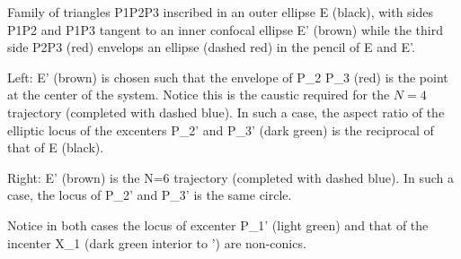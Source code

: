 Family of triangles P1P2P3 inscribed in an outer ellipse E (black), with sides P1P2 and P1P3 tangent to an inner confocal ellipse E' (brown) while the third side P2P3 (red) envelops an ellipse (dashed red) in the pencil of E and E'.

Left: E' (brown) is chosen such that the envelope of P_2 P_3 (red) is the point at the center of the system. Notice this is the caustic required for the $N=4$ trajectory (completed with dashed blue). In such a case, the aspect ratio of the elliptic locus of the excenters P_2' and P_3' (dark green) is the reciprocal of that of E (black).

Right: E' (brown) is the N=6 trajectory (completed with dashed blue). In such a case, the locus of P_2' and P_3' is the same circle.

Notice in both cases the locus of excenter P_1' (light green) and that of the incenter X_1 (dark green interior to \E') are non-conics.
